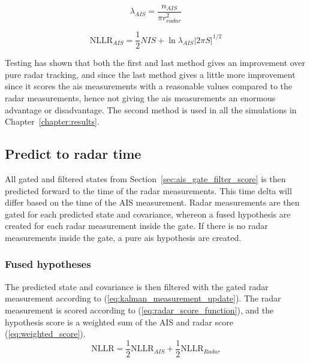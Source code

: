 \begin{equation}\label{eq:ais_clutter_density}
\lambda_{AIS} = \frac{n_{AIS}}{\pi r_{radar}^2}
\end{equation}

\begin{equation}\label{eq:ais_score_function2}
\mathrm{NLLR}_{AIS} = \frac{1}{2} NIS + \ln \lambda_{AIS} |2 \pi S|^{1/2} 
\end{equation}

Testing has shown that both the first and last method gives an improvement over pure radar tracking, and since the last method gives a little more improvement since it scores the \gls{ais} measurements with a reasonable values compared to the radar measurements, hence not giving the \gls{ais} measurements an enormous advantage or disadvantage. The second method is used in all the simulations in Chapter~\ref{chapter:results}.

\subsection{Predict to radar time}
All gated and filtered states from Section~\ref{sec:ais_gate_filter_score} is then predicted forward to the time of the radar measurements. This time delta will differ based on the time of the AIS measurement. Radar measurements are then gated for each predicted state and covariance, whereon a fused hypothesis are created for each radar measurement inside the gate. If there is no radar measurements inside the \gls{gate}, a pure \gls{ais} hypothesis are created. 

\subsubsection{Fused hypotheses}
The predicted state and covariance is then filtered with the gated radar measurement according to (\ref{eq:kalman_measurement_update}). The radar measurement is scored according to (\ref{eq:radar_score_function}), and the hypothesis score is a weighted sum of the AIS and radar score (\ref{eq:weighted_score}).
\begin{equation}\label{eq:weighted_score}
\mathrm{NLLR} = \frac{1}{2} \mathrm{NLLR}_{AIS} + \frac{1}{2} \mathrm{NLLR}_{Radar}
\end{equation}

